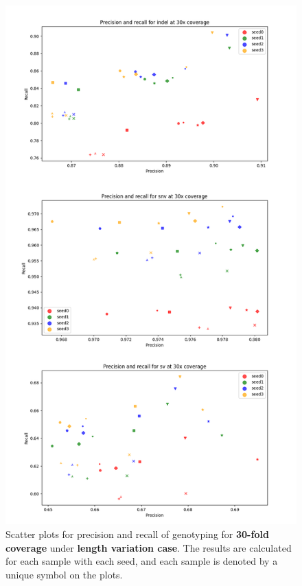 \documentclass{PHlab-thesis}
\begin{document}
\begin{figure}[ht!]
	\centering
	\includegraphics[scale=0.5]{figures/len_genotyping_30x.png}
	\caption{Scatter plots for precision and recall of genotyping for \textbf{30-fold coverage} under \textbf{length variation case}. The results are calculated for each sample with each seed, and each sample is denoted by a unique symbol on the plots.}
	\label{fig:len_genotyping_30x} %
\end{figure}
\end{document}
